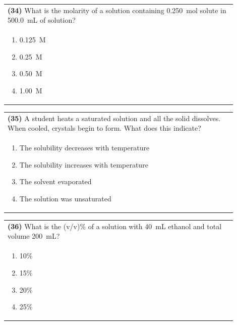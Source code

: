 \documentclass{article}
\begin{document}
\noindent\begin{tabular}{|p{0.9\linewidth}|}
\hline
\textbf{(34)} What is the molarity of a solution containing 0.250~mol solute in 500.0~mL of solution?\\[0.2cm]
\begin{minipage}[t]{0.85\linewidth}
\begin{enumerate}[label=\alph*.]
\item 0.125~M
\item 0.25~M
\item 0.50~M
\item 1.00~M
\end{enumerate}
\end{minipage}\\[0.2cm]
\hline
\end{tabular}

\noindent\begin{tabular}{|p{0.9\linewidth}|}
\hline
\textbf{(35)} A student heats a saturated solution and all the solid dissolves. When cooled, crystals begin to form. What does this indicate?\\[0.2cm]
\begin{minipage}[t]{0.85\linewidth}
\begin{enumerate}[label=\alph*.]
\item The solubility decreases with temperature
\item The solubility increases with temperature
\item The solvent evaporated
\item The solution was unsaturated
\end{enumerate}
\end{minipage}\\[0.2cm]
\hline
\end{tabular}

\noindent\begin{tabular}{|p{0.9\linewidth}|}
\hline
\textbf{(36)} What is the (v/v)\% of a solution with 40~mL ethanol and total volume 200~mL?\\[0.2cm]
\begin{minipage}[t]{0.85\linewidth}
\begin{enumerate}[label=\alph*.]
\item 10\%
\item 15\%
\item 20\%
\item 25\%
\end{enumerate}
\end{minipage}\\[0.2cm]
\hline
\end{tabular}
\newpage
\end{document}
